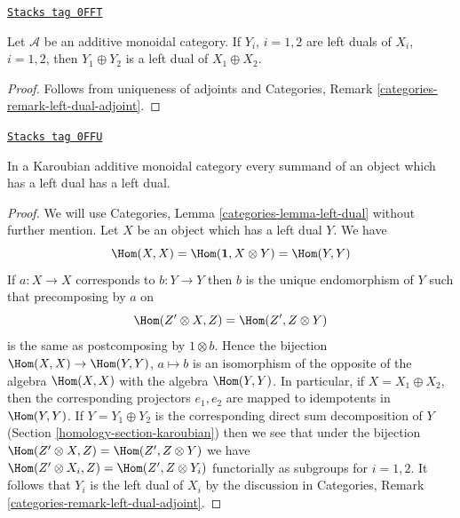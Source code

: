 \begin{lemma}
\label{homology-lemma-additive-dual}
\href{https://stacks.math.columbia.edu/tag/0FFT}{\texttt{Stacks tag 0FFT}}

Let $\mathcal{A}$ be an additive monoidal category.
If $Y_i$, $i = 1, 2$ are left duals of $X_i$, $i = 1, 2$, then
$Y_1 \oplus Y_2$ is a left dual of $X_1 \oplus X_2$.
\end{lemma}

\begin{proof}
Follows from uniqueness of adjoints and
Categories, Remark \ref{categories-remark-left-dual-adjoint}.
\end{proof}

\begin{lemma}
\label{homology-lemma-Karoubian-dual}
\href{https://stacks.math.columbia.edu/tag/0FFU}{\texttt{Stacks tag 0FFU}}

In a Karoubian additive monoidal category every summand
of an object which has a left dual has a left dual.
\end{lemma}

\begin{proof}
We will use Categories, Lemma \ref{categories-lemma-left-dual}
without further mention.
Let $X$ be an object which has a left dual $Y$. We have
$$
\Hom(X, X) = \Hom(\mathbf{1}, X \otimes Y) = \Hom(Y, Y)
$$
If $a : X \to X$ corresponds to $b : Y \to Y$ then $b$ is the unique
endomorphism of $Y$ such that precomposing by $a$ on
$$
\Hom(Z' \otimes X, Z) = \Hom(Z', Z \otimes Y)
$$
is the same as postcomposing by $1 \otimes b$.
Hence the bijection $\Hom(X, X) \to \Hom(Y, Y)$, $a \mapsto b$
is an isomorphism of the opposite of the algebra $\Hom(X, X)$ with
the algebra $\Hom(Y, Y)$. In particular, if $X = X_1 \oplus X_2$, then
the corresponding projectors $e_1, e_2$ are mapped to idempotents
in $\Hom(Y, Y)$. If $Y = Y_1 \oplus Y_2$ is the corresponding direct
sum decomposition of $Y$ (Section \ref{homology-section-karoubian})
then we see that under the bijection
$\Hom(Z' \otimes X, Z) = \Hom(Z', Z \otimes Y)$
we have $\Hom(Z' \otimes X_i, Z) = \Hom(Z', Z \otimes Y_i)$
functorially as subgroups for $i = 1, 2$.
It follows that $Y_i$ is the left dual of
$X_i$ by the discussion in
Categories, Remark \ref{categories-remark-left-dual-adjoint}.
\end{proof}

